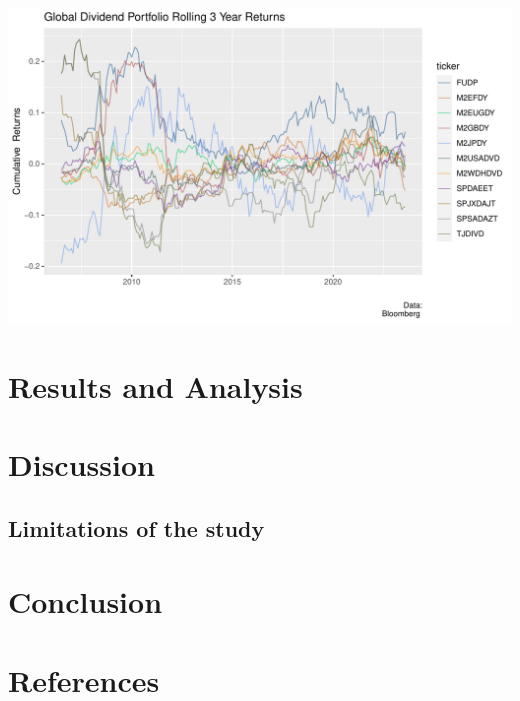 \documentclass[12pt,preprint, authoryear]{elsarticle}
\let\origfigure\figure
\let\endorigfigure\endfigure
\renewenvironment{figure}[1][2] {
    \expandafter\origfigure\expandafter[H]
} {
    \endorigfigure
}
\numberwithin{equation}{section}
\numberwithin{figure}{section}
\numberwithin{table}{section}
\begin{document}
\begin{figure}[H]

{\centering \includegraphics{ThesisWriteUp_files/figure-latex/Figure2-1} 

}

\caption{Rolling 3 Year Returns \label{Fig2}}\label{fig:Figure2}
\end{figure}

\hypertarget{results-and-analysis}{%
\section{Results and Analysis}\label{results-and-analysis}}

\hypertarget{discussion}{%
\section{Discussion}\label{discussion}}

\hypertarget{limitations-of-the-study}{%
\subsection{Limitations of the study}\label{limitations-of-the-study}}

\hypertarget{conclusion}{%
\section{Conclusion}\label{conclusion}}

\newpage

\hypertarget{references}{%
\section*{References}\label{references}}
\end{document}
